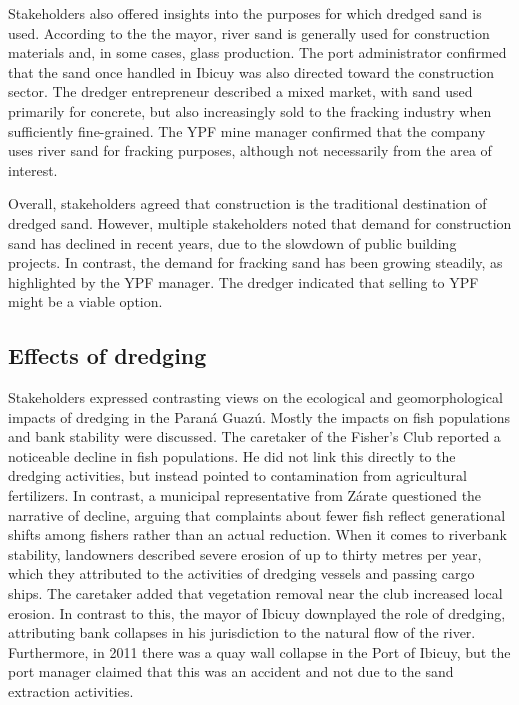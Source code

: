 Stakeholders also offered insights into the purposes for which dredged sand is used. According to the the mayor, river sand is generally used for construction materials and, in some cases, glass production. The port administrator confirmed that the sand once handled in Ibicuy was also directed toward the construction sector. The dredger entrepreneur described a mixed market, with sand used primarily for concrete, but also increasingly sold to the fracking industry when sufficiently fine-grained. The YPF mine manager confirmed that the company uses river sand for fracking purposes, although not necessarily from the area of interest.

Overall, stakeholders agreed that construction is the traditional destination of dredged sand. However, multiple stakeholders noted that demand for construction sand has declined in recent years, due to the slowdown of public building projects. In contrast, the demand for fracking sand has been growing steadily, as highlighted by the YPF manager. The dredger indicated that selling to YPF might be a viable option.

\subsection{Effects of dredging}
Stakeholders expressed contrasting views on the ecological and geomorphological impacts of dredging in the Paraná Guazú. Mostly the impacts on fish populations and bank stability were discussed. The caretaker of the Fisher’s Club reported a noticeable decline in fish populations. He did not link this directly to the dredging activities, but instead pointed to contamination from agricultural fertilizers. In contrast, a municipal representative from Zárate questioned the narrative of decline, arguing that complaints about fewer fish reflect generational shifts among fishers rather than an actual reduction. When it comes to riverbank stability, landowners described severe erosion of up to thirty metres per year, which they attributed to the activities of dredging vessels and passing cargo ships. The caretaker added that vegetation removal near the club increased local erosion. In contrast to this, the mayor of Ibicuy downplayed the role of dredging, attributing bank collapses in his jurisdiction to the natural flow of the river. Furthermore, in 2011 there was a quay wall collapse in the Port of Ibicuy, but the port manager claimed that this was an accident and not due to the sand extraction activities.

